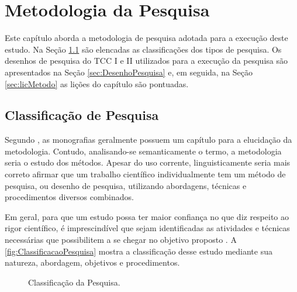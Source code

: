 \chapter{Metodologia da Pesquisa}\label{metodologiaPesquisa}

Este capítulo aborda a metodologia de pesquisa adotada para a execução deste estudo. 
Na Seção \ref{sec:TiposPesquisa} são elencadas as classificações dos tipos de pesquisa. 
Os desenhos de pesquisa do \ac{TCC} I e II utilizados para a execução da pesquisa são apresentados na Seção \ref{sec:DesenhoPesquisa} e, em seguida, na Seção \ref{sec:licMetodo} as lições do capítulo são pontuadas.

\section{Classificação de Pesquisa} \label{sec:TiposPesquisa}

Segundo , as monografias geralmente possuem um capítulo para a elucidação da metodologia. 
Contudo, analisando-se semanticamente o termo, a metodologia seria o estudo dos métodos. 
Apesar do uso corrente, linguisticamente seria mais correto afirmar que um trabalho científico individualmente tem um método de pesquisa, ou desenho de pesquisa, utilizando abordagens, técnicas e procedimentos diversos combinados.

Em geral, para que um estudo possa ter maior confiança no que diz respeito ao rigor científico, é imprescindível que sejam identificadas as atividades e técnicas necessárias que possibilitem a se chegar no objetivo proposto \cite{Peffers:2007}. A \autoref{fig:ClassificacaoPesquisa} mostra a classificação desse estudo mediante sua natureza, abordagem, objetivos e procedimentos. 



\begin{figure}[!htb]
\centering
\caption{Classificação da Pesquisa.}

\label{fig:ClassificacaoPesquisa}
\end{figure}

